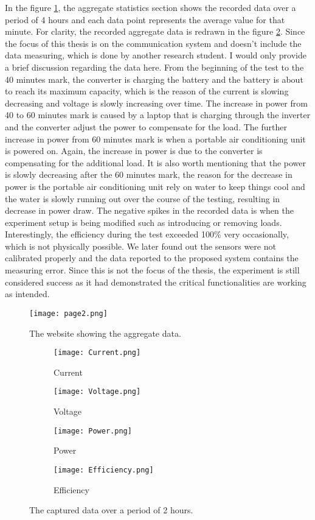 \documentclass[../thesis.tex]{subfiles}
\begin{document}
In the figure \ref{fig:page2}, the aggregate statistics section shows the recorded data over a period of 4 hours and each data point represents the average value for that minute. For clarity, the recorded aggregate data is redrawn in the figure \ref{fig:captured}. Since the focus of this thesis is on the communication system and doesn't include the data measuring, which is done by another research student. I would only provide a brief discussion regarding the data here. From the beginning of the test to the 40 minutes mark, the converter is charging the battery and the battery is about to reach its maximum capacity, which is the reason of the current is slowing decreasing and voltage is slowly increasing over time. The increase in power from 40 to 60 minutes mark is caused by a laptop that is charging through the inverter and the converter adjust the power to compensate for the load. The further increase in power from 60 minutes mark is when a portable air conditioning unit is powered on. Again, the increase in power is due to the converter is compensating for the additional load. It is also worth mentioning that the power is slowly decreasing after the 60 minutes mark, the reason for the decrease in power is the portable air conditioning unit rely on water to keep things cool and the water is slowly running out over the course of the testing, resulting in decrease in power draw. The negative spikes in the recorded data is when the experiment setup is being modified such as introducing or removing loads. Interestingly, the efficiency during the test exceeded 100\% very occasionally, which is not physically possible. We later found out the sensors were not calibrated properly and the data reported to the proposed system contains the measuring error. Since this is not the focus of the thesis, the experiment is still considered success as it had demonstrated the critical functionalities are working as intended. 

\begin{figure}[!ht]
	\centering
	\texttt{[image: page2.png]}
	\caption{The website showing the aggregate data.}
	\label{fig:page2}
\end{figure}

\begin{figure}[!ht]
	\centering
	\begin{subfigure}[b]{0.49\linewidth}
		\texttt{[image: Current.png]}
		\caption{Current}
	\end{subfigure}
	\begin{subfigure}[b]{0.49\linewidth}
		\texttt{[image: Voltage.png]}
		\caption{Voltage}
	\end{subfigure}
	\begin{subfigure}[b]{0.49\linewidth}
		\texttt{[image: Power.png]}
		\caption{Power}
	\end{subfigure}
	\begin{subfigure}[b]{0.49\linewidth}
		\texttt{[image: Efficiency.png]}
		\caption{Efficiency}
	\end{subfigure}
	\caption{The captured data over a period of 2 hours.}
	\label{fig:captured}
\end{figure}
\end{document}
